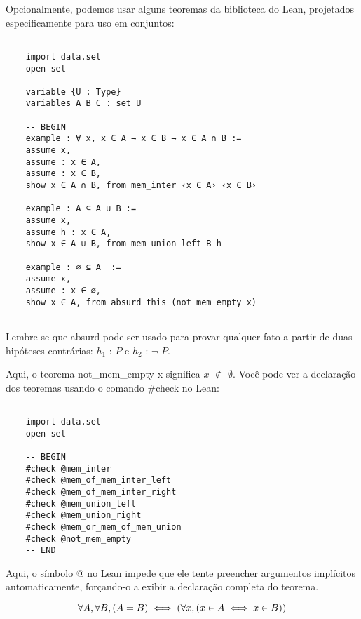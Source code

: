 Opcionalmente, podemos usar alguns teoremas da biblioteca do Lean, projetados especificamente para uso em conjuntos:

\begin{lstlisting}

    import data.set
    open set

    variable {U : Type}
    variables A B C : set U

    -- BEGIN
    example : ∀ x, x ∈ A → x ∈ B → x ∈ A ∩ B :=
    assume x,
    assume : x ∈ A,
    assume : x ∈ B,
    show x ∈ A ∩ B, from mem_inter ‹x ∈ A› ‹x ∈ B›

    example : A ⊆ A ∪ B :=
    assume x,
    assume h : x ∈ A,
    show x ∈ A ∪ B, from mem_union_left B h

    example : ∅ ⊆ A  :=
    assume x,
    assume : x ∈ ∅,
    show x ∈ A, from absurd this (not_mem_empty x)
 
\end{lstlisting}

Lembre-se que{
\selectfont absurd} pode ser usado para provar qualquer fato a partir de duas hipóteses contrárias: $h_1$ : $P$ e $h_2$ : $\neg$ $P$. 

Aqui, o teorema {
\selectfont not\_mem\_empty x} significa $x$ $\notin$ $\emptyset$. Você pode ver a declaração dos teoremas usando o comando {
\selectfont \#check} no Lean:

\begin{lstlisting}

    import data.set
    open set

    -- BEGIN
    #check @mem_inter
    #check @mem_of_mem_inter_left
    #check @mem_of_mem_inter_right
    #check @mem_union_left
    #check @mem_union_right
    #check @mem_or_mem_of_mem_union
    #check @not_mem_empty
    -- END

\end{lstlisting}

Aqui, o símbolo{
\selectfont @} no Lean impede que ele tente preencher argumentos implícitos automaticamente, forçando-o a exibir a declaração completa do teorema.

    \[\forall A, \space \forall B, \space (A=B) \iff (\forall x,  (x \in A \iff x \in B))\]